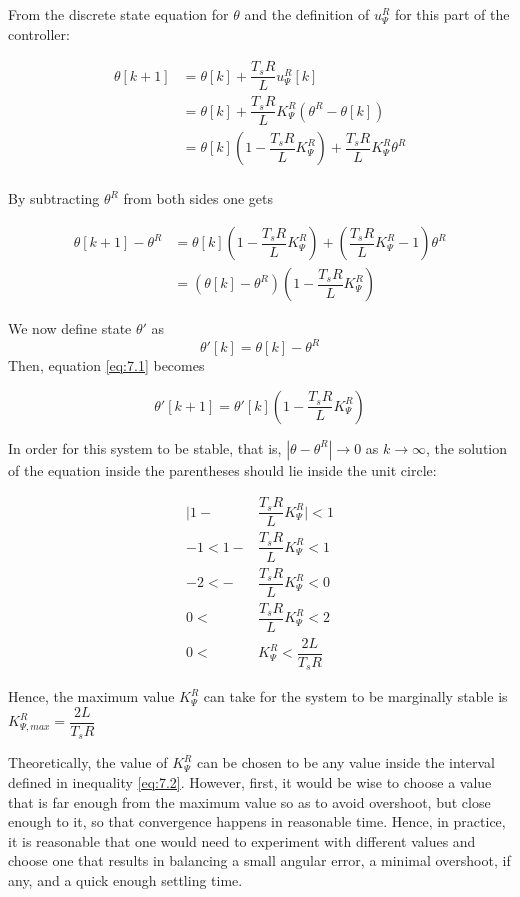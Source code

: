 From the discrete state equation for $\theta$ and the definition of
$u_{\Psi}^R$ for this part of the controller:

\begin{align*}
  \theta[k+1] &= \theta[k] + \dfrac{T_s R}{L} u_{\Psi}^R[k]  \\
            ~ &= \theta[k] + \dfrac{T_s R}{L} K_{\Psi}^R (\theta^R - \theta[k]) \\
            ~ &= \theta[k](1 - \dfrac{T_s R}{L} K_{\Psi}^R) + \dfrac{T_s R}{L} K_{\Psi}^R \theta^R  \\
\end{align*}

By subtracting $\theta^R$ from both sides one gets

\begin{align}
  \theta[k+1] - \theta^R &= \theta[k](1 - \dfrac{T_s R}{L} K_{\Psi}^R) + (\dfrac{T_s R}{L} K_{\Psi}^R - 1) \theta^R \nonumber \\
                     ~ &= (\theta[k] - \theta^R)(1 - \dfrac{T_s R}{L} K_{\Psi}^R) \label{eq:7.1}
\end{align}

We now define state $\theta'$ as
$$\theta'[k] = \theta[k] - \theta^R$$
Then, equation \ref{eq:7.1} becomes

\begin{equation}
  \theta'[k+1] = \theta'[k](1 - \dfrac{T_s R}{L} K_{\Psi}^R)
  \label{eq:7.theta_k_plus_one}
\end{equation}

In order for this system to be stable, that is, $| \theta - \theta^R | \rightarrow 0$
as $k \rightarrow \infty$, the solution of the equation inside the parentheses
should lie inside the unit circle:

\begin{align}
  \Big|1 - &\dfrac{T_s R}{L} K_{\Psi}^R\Big| < 1 \nonumber \\
  -1 < 1 - &\dfrac{T_s R}{L} K_{\Psi}^R < 1 \nonumber \\
  -2 < - &\dfrac{T_s R}{L} K_{\Psi}^R < 0 \nonumber \\
   0 <\ &\dfrac{T_s R}{L} K_{\Psi}^R < 2 \nonumber \\
   0 <\ &K_{\Psi}^R < \dfrac{2L}{T_s R} \label{eq:7.2}
\end{align}

Hence, the maximum value $K_{\Psi}^R$ can take for the system to be marginally
stable is $K_{\Psi,max}^R = \dfrac{2L}{T_s R}$

Theoretically, the value of $K_{\Psi}^R$ can be chosen to be any value inside
the interval defined in inequality \ref{eq:7.2}. However, first, it would be
wise to choose a value that is far enough from the maximum value so as to avoid
overshoot, but close enough to it, so that convergence happens in reasonable
time. Hence, in practice, it is reasonable that one would need to experiment
with different values and choose one that results in balancing a small angular
error, a minimal overshoot, if any, and a quick enough settling time.

